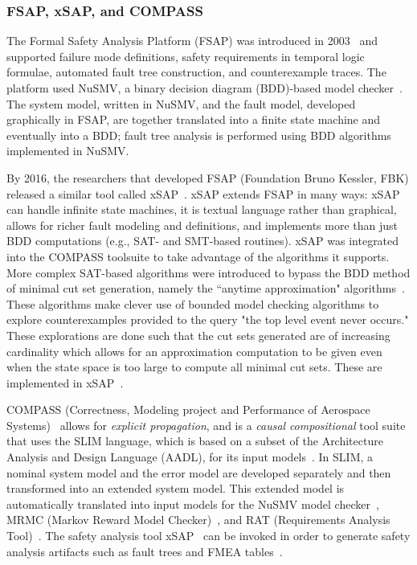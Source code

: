 \subsubsection{FSAP, xSAP, and COMPASS}
The Formal Safety Analysis Platform (FSAP) was introduced in 2003~\cite{bozzano2003improving} and supported failure mode definitions, safety requirements in temporal logic formulae, automated fault tree construction, and counterexample traces. The platform used NuSMV, a binary decision diagram (BDD)-based model checker~\cite{Cimatti2000}. The system model, written in NuSMV, and the fault model, developed graphically in FSAP, are together translated into a finite state machine and eventually into a BDD; fault tree analysis is performed using BDD algorithms implemented in NuSMV. 

By 2016, the researchers that developed FSAP (Foundation Bruno Kessler, FBK) released a similar tool called xSAP~\cite{DBLP:conf/tacas/BittnerBCCGGMMZ16}. xSAP extends FSAP in many ways: xSAP can handle infinite state machines, it is textual language rather than graphical, allows for richer fault modeling and definitions, and implements more than just BDD computations (e.g., SAT- and SMT-based routines). xSAP was integrated into the COMPASS toolsuite to take advantage of the algorithms it supports. More complex SAT-based algorithms were introduced to bypass the BDD method of minimal cut set generation, namely the ``anytime approximation" algorithms~\cite{CAV2015:BoCiGrMa, mattarei2016scalable}. These algorithms make clever use of bounded model checking algorithms to explore counterexamples provided to the query "the top level event never occurs." These explorations are done such that the cut sets generated are of increasing cardinality which allows for an approximation computation to be given even when the state space is too large to compute all minimal cut sets. These are implemented in xSAP~\cite{CAV2015:BoCiGrMa}.

COMPASS (Correctness, Modeling project and Performance of Aerospace Systems)~\cite{10.1007/978-3-642-04468-7_15} allows for {\em explicit propagation}, and is a {\em causal} {\em compositional} tool suite that uses the SLIM language, which is based on a subset of the Architecture Analysis and Design Language (AADL), for its input models~\cite{5185388, criticalembeddedsystems}. In SLIM, a nominal system model and the error model are developed separately and then transformed into an extended system model.  This extended model is automatically translated into input models for the NuSMV model checker~\cite{Cimatti2000, NuSMV}, MRMC (Markov Reward Model Checker)~\cite{Katoen:2005:MRM:1114692.1115230, MRMC}, and RAT (Requirements Analysis Tool)~\cite{RAT}. The safety analysis tool xSAP~\cite{DBLP:conf/tacas/BittnerBCCGGMMZ16} can be invoked in order to generate safety analysis artifacts such as fault trees and FMEA tables~\cite{compass30toolset}.  %

